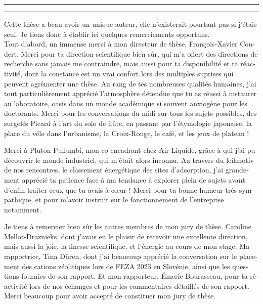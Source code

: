 \begin{otherlanguage}{french}

\hrule\relax
\vspace*{.9\baselineskip}%
{\huge{}}\par%
\vspace*{1.1\baselineskip}%
\hrule\relax
\vspace*{\baselineskip}%


\begingroup

Cette thèse a beau avoir un unique auteur, elle n'existerait pourtant pas si j'étais seul. Je tiens donc à établir ici quelques remerciements opportuns.\\

Tout d'abord, un immense merci à mon directeur de thèse, François-Xavier Coudert. Merci pour ta direction scientifique bien sûr, qui m'a offert des directions de recherche sans jamais me contraindre, mais aussi pour ta disponibilité et ta réactivité, dont la constance est un vrai confort lors des multiples suprises qui peuvent agrémenter une thèse. Au rang de tes nombreuses qualités humaines, j'ai tout particulièrement apprécié l'atmosphère détendue que tu as réussi à instaurer au laboratoire, oasis dans un monde académique si souvent anxiogène pour les doctorants. Merci pour les conversations du midi sur tous les sujets possibles, des surgelés Picard à l'art du solo de flûte, en passant par l'étymologie japonaise, la place du vélo dans l'urbanisme, la Croix-Rouge, le café, et les jeux de plateau !

Merci à Pluton Pullumbi, mon co-encadrant chez Air Liquide, grâce à qui j'ai pu découvrir le monde industriel, qui m'était alors inconnu. Au travers du leitmotiv de nos rencontres, le classement énergétique des sites d'adsorption, j'ai grandement apprécié ta patience face à ma tendance à explorer plein de sujets avant d'enfin traiter ceux que tu avais à cœur ! Merci pour ta bonne humeur très sympathique, et pour m'avoir instruit sur le fonctionnement de l'entreprise notamment.

Je tiens à remercier bien sûr les autres membres de mon jury de thèse. Caroline Mellot-Draznieks, dont j'avais eu le plaisir de recevoir une excellente direction, mais aussi la joie, la finesse scientifique, et l'énergie au cours de mon stage. Ma rapportrice, Tina Düren, dont j'ai beaucoup apprécié la conversation sur le placement des cations zéolitiques lors de FEZA 2023 en Slovénie, ainsi que les questions fournies de son rapport. Et mon rapporteur, Émeric Bourasseau, pour ta réactivité lors de nos échanges et pour les commentaires détaillés de son rapport. Merci beaucoup pour avoir accepté de constituer mon jury de thèse.


\end{otherlanguage}
